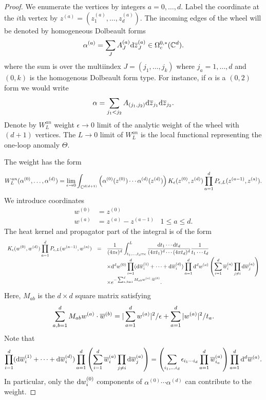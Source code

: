 \begin{proof}

We enumerate the vertices by integers $a = 0,\ldots, d$. 
Label the coordinate at the $i$th vertex by $z^{(a)} = (z_1^{(a)}, \ldots, z_d^{(a)})$. 
The incoming edges of the wheel will be denoted by homogeneous Dolbeault forms 
\[
\alpha^{(a)} = \sum_{J} A^{(a)}_J \d \zbar_J^{(a)} \in \Omega_c^{0,*}(\CC^d) .
\]
where the sum is over the multiindex $J = (j_1,\ldots, j_k)$ where $j_a = 1,\ldots, d$ and $(0,k)$ is the homogenous Dolbeault form type. 
For instance, if $\alpha$ is a $(0,2)$ form we would write
\[
\alpha = \sum_{j_1 < j_2} A_{(j_1,j_2)} \d \zbar_{j_1} \d\zbar_{j_2} .
\]
Denote by $W^{an}_L$ weight $\epsilon \to 0$ limit of the analytic weight of the wheel with $(d+1)$ vertices.
The $L\to 0$ limit of $W^{an}_L$ is the local functional representing the one-loop anomaly $\Theta$. 

The weight has the form
\[
W^{an}_L(\alpha^{(0)},\ldots,\alpha^{(d)}) = \lim_{\epsilon \to 0} \int_{\CC^{d(d+1)}} \left(\alpha^{(0)}(z^{(0)}) \cdots \alpha^{(d)}(z^{(d)}) \right) K_\epsilon(z^{(0)},z^{(d)}) \prod_{a =1}^d P_{\epsilon,L} (z^{(a-1)}, z^{(a)}) .
\]
We introduce coordinates
\begin{align*}
w^{(0)} & = z^{(0)} \\
w^{(a)} & = z^{(a)} - z^{(a-1)} \;\;\; 1 \leq a \leq d .
\end{align*}
The heat kernel and propagator part of the integral is of the form
\[
\begin{array}{ccl}
\displaystyle
K_\epsilon(w^{(0)},w^{(d)}) \prod_{a =1}^d P_{\epsilon,L} (w^{(a-1)}, w^{(a)}) & = & \displaystyle \frac{1}{(4 \pi \epsilon)^d} \int_{t_1,\ldots,t_d = \epsilon}^L \frac{\d t_1 \cdots \d t_d}{(4 \pi t_1)^d \cdots (4 \pi t_d)^d} \frac{1}{t_1\cdots t_d}  \\ & & \displaystyle \times \d^d w^{(0)} \prod_{i=1}^d (\d \Bar{w}^{(1)}_i + \cdots + \d \Bar{w}^{(d)}_i) \prod_{a = 1}^d \d^d w^{(a)} \left(\sum_{i = 1}^d \Bar{w}_i^{(a)} \prod_{j \ne i} \d \Bar{w}_{j}^{(a)}\right)
\\ & & \displaystyle \times e^{-\sum_{a,b = 1}^d M_{a b} w^{(a)} \cdot \Bar{w}^{(b)}} .
\end{array}
\]
Here, $M_{ab}$ is the $d \times d$ square matrix satisfying
\[
\sum_{a,b = 1}^d M_{a b} w^{(a)} \cdot \Bar{w}^{(b)} = |\sum_{a = 1}^d w^{(a)} |^2 / \epsilon + \sum_{a = 1}^d |w^{(a)}|^2 / t_a .
\]
Note that
\[
\prod_{i=1}^d (\d \Bar{w}^{(1)}_i + \cdots + \d \Bar{w}^{(d)}_i) \prod_{a = 1}^d \left(\sum_{i = 1}^d \Bar{w}_i^{(a)} \prod_{j \ne i} \d \Bar{w}_{j}^{(a)}\right) = \left( \sum_{i_1,\ldots i_d} \epsilon_{i_1\cdots i_d} \prod_{a=1}^d \Bar{w}^{(a)}_{i_a}\right) \prod_{a=1}^d \d^d \Bar{w}^{(a)} .
\]
In particular, only the $\d w_i^{(0)}$ components of $\alpha^{(0)} \cdots \alpha^{(d)}$ can contribute to the weight.


\end{proof}
